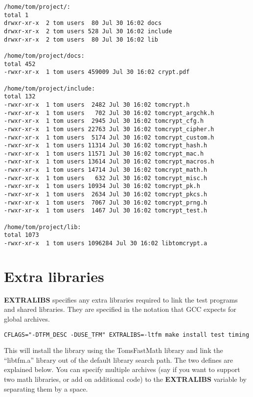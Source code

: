 \documentclass[a4paper]{book}
\begin{document}
\begin{small}
\begin{verbatim}
/home/tom/project/:
total 1
drwxr-xr-x  2 tom users  80 Jul 30 16:02 docs
drwxr-xr-x  2 tom users 528 Jul 30 16:02 include
drwxr-xr-x  2 tom users  80 Jul 30 16:02 lib

/home/tom/project/docs:
total 452
-rwxr-xr-x  1 tom users 459009 Jul 30 16:02 crypt.pdf

/home/tom/project/include:
total 132
-rwxr-xr-x  1 tom users  2482 Jul 30 16:02 tomcrypt.h
-rwxr-xr-x  1 tom users   702 Jul 30 16:02 tomcrypt_argchk.h
-rwxr-xr-x  1 tom users  2945 Jul 30 16:02 tomcrypt_cfg.h
-rwxr-xr-x  1 tom users 22763 Jul 30 16:02 tomcrypt_cipher.h
-rwxr-xr-x  1 tom users  5174 Jul 30 16:02 tomcrypt_custom.h
-rwxr-xr-x  1 tom users 11314 Jul 30 16:02 tomcrypt_hash.h
-rwxr-xr-x  1 tom users 11571 Jul 30 16:02 tomcrypt_mac.h
-rwxr-xr-x  1 tom users 13614 Jul 30 16:02 tomcrypt_macros.h
-rwxr-xr-x  1 tom users 14714 Jul 30 16:02 tomcrypt_math.h
-rwxr-xr-x  1 tom users   632 Jul 30 16:02 tomcrypt_misc.h
-rwxr-xr-x  1 tom users 10934 Jul 30 16:02 tomcrypt_pk.h
-rwxr-xr-x  1 tom users  2634 Jul 30 16:02 tomcrypt_pkcs.h
-rwxr-xr-x  1 tom users  7067 Jul 30 16:02 tomcrypt_prng.h
-rwxr-xr-x  1 tom users  1467 Jul 30 16:02 tomcrypt_test.h

/home/tom/project/lib:
total 1073
-rwxr-xr-x  1 tom users 1096284 Jul 30 16:02 libtomcrypt.a
\end{verbatim}
\end{small}

\section{Extra libraries}
\textbf{EXTRALIBS} specifies any extra libraries required to link the test programs and shared libraries.  They are specified in the notation
that GCC expects for global archives.

\begin{verbatim}
CFLAGS="-DTFM_DESC -DUSE_TFM" EXTRALIBS=-ltfm make install test timing
\end{verbatim}

This will install the library using the TomsFastMath library and link the ``libtfm.a'' library out of the default library search path.  The two
defines are explained below.  You can specify multiple archives (say if you want to support two math libraries, or add on additional code) to 
the \textbf{EXTRALIBS} variable by separating them by a space.
\end{document}
